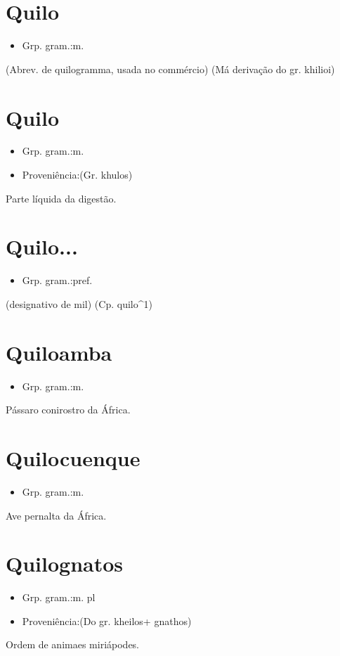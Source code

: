 \section{Quilo}
\begin{itemize}
\item {Grp. gram.:m.}
\end{itemize}
(Abrev. de \textunderscore quilogramma\textunderscore , usada no commércio)
(Má derivação do gr. \textunderscore khilioi\textunderscore )
\section{Quilo}
\begin{itemize}
\item {Grp. gram.:m.}
\end{itemize}
\begin{itemize}
\item {Proveniência:(Gr. \textunderscore khulos\textunderscore )}
\end{itemize}
Parte líquida da digestão.
\section{Quilo...}
\begin{itemize}
\item {Grp. gram.:pref.}
\end{itemize}
(designativo de mil)
(Cp. \textunderscore quilo\textunderscore ^1)
\section{Quiloamba}
\begin{itemize}
\item {Grp. gram.:m.}
\end{itemize}
Pássaro conirostro da África.
\section{Quilocuenque}
\begin{itemize}
\item {Grp. gram.:m.}
\end{itemize}
Ave pernalta da África.
\section{Quilognatos}
\begin{itemize}
\item {Grp. gram.:m. pl}
\end{itemize}
\begin{itemize}
\item {Proveniência:(Do gr. \textunderscore kheilos\textunderscore  + \textunderscore gnathos\textunderscore )}
\end{itemize}
Ordem de animaes miriápodes.
